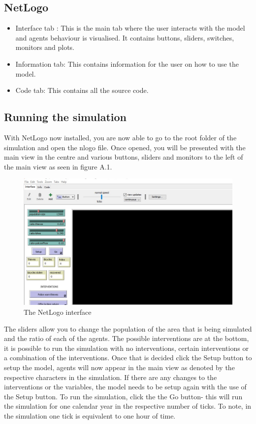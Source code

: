 \documentclass[11pt]{informatics-report}
\begin{document}
\subsection{NetLogo }
\begin{itemize}
\item Interface tab : This is the main tab where the user interacts with the model and agents behaviour is visualised. It contains buttons, sliders, switches, monitors and plots.
\item Information tab: This contains information for the user on how to use the model.
\item Code tab: This contains all the source code.
\end{itemize}
\subsection{Running the simulation}
With NetLogo now installed, you are now able to go to the root folder of the simulation and open the nlogo file. Once opened, you will be presented with the main view in the centre and various buttons, sliders and monitors to the left of the main view as seen in figure A.1.

\begin{figure}
\includegraphics[scale = 0.4]{interface.png}
\caption{The NetLogo interface}
\end{figure}

The sliders allow you to change the population of the area that is being simulated and the ratio of each of the agents. The possible interventions are at the bottom, it is possible to run the simulation with no interventions, certain interventions or a combination of the interventions. Once that is decided click the Setup button to setup the model, agents will now appear in the main view as denoted by the respective characters in the simulation. If there are any changes to the interventions or the variables, the model needs to be setup again with the use of the Setup button. To run the simulation, click the the Go button- this will run the simulation for one calendar year in the respective number of ticks. To note, in the simulation one tick is equivalent to one hour of time. \par
\end{document}
